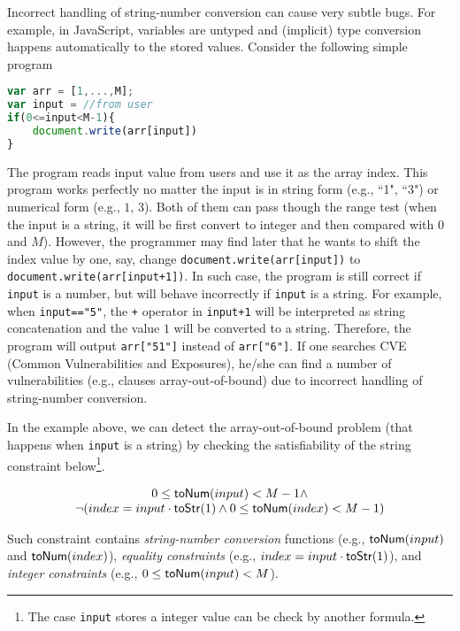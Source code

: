 \documentclass[sigplan,review,anonymous]{acmart}\settopmatter{printfolios=true,printccs=false,printacmref=false}
\begin{document}
{Incorrect handling of string-number conversion can cause very subtle bugs.
For example, in JavaScript, variables are untyped and (implicit) type conversion happens automatically to the stored values. Consider the following simple program


\begin{lstlisting}[breaklines=true,language=JavaScript]
var arr = [1,...,M];
var input = //from user
if(0<=input<M-1){
	document.write(arr[input])
}
\end{lstlisting}

The program reads input value from users and use it as the array index. This program works perfectly no matter the input is in string form (e.g., ``1", ``3") or numerical form (e.g., $1$, $3$). Both of them can pass though the range test (when the input is a string, it will be first convert to integer and then compared with $0$ and $M$). However, the programmer may find later that he wants to shift the index value by one, say, change \texttt{document.write(arr[input])} to \texttt{document.write(arr[input+1])}. In such case, the program is still correct if \texttt{input} is a number, but will behave incorrectly if \texttt{input} is a string. For example, when \texttt{input=="5"}, the \texttt{+} operator in \texttt{input+1} will be interpreted as string concatenation and the value $1$ will be converted to a string. Therefore, the program will output \texttt{arr["51"]} instead of \texttt{arr["6"]}. If one searches CVE (Common Vulnerabilities and Exposures), he/she can find a number of vulnerabilities (e.g., clauses array-out-of-bound) due to incorrect handling of string-number conversion.

In the example above, we can detect the array-out-of-bound problem (that happens when \texttt{input} is a string) by checking the satisfiability of the string constraint below\footnote{The case \texttt{input} stores a integer value can be check by another formula.}. 

$$
\begin{array}{c}
0 \leq \mbox{\textsf{toNum}($input$)}<M-1 \wedge \\
\neg(index = input\cdot \mbox{\textsf{toStr}($1$)} \wedge 0 \leq \mbox{\textsf{toNum}($index$)} <M-1)
\end{array}
$$


Such constraint contains \textit{string-number conversion} functions (e.g., $\mbox{\textsf{toNum}($input$)}$ and $\mbox{\textsf{toNum}($index$)}$), \textit{equality constraints} (e.g., $index = input\cdot \mbox{\textsf{toStr}($1$)}$), and \textit{integer constraints} (e.g., $0 \leq \mbox{\textsf{toNum}($input$)}<M$). }
\end{document}
